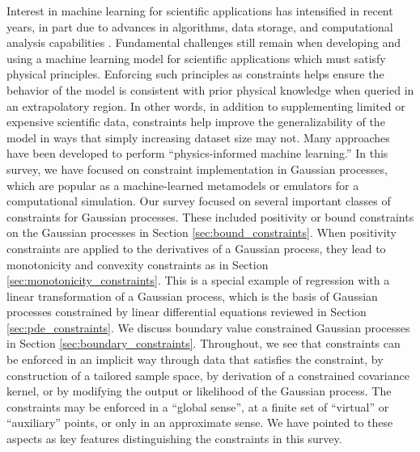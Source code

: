 \label{sec:conclusion}
Interest in machine learning for scientific applications has intensified in recent 
years, in part due to advances in algorithms, data storage, and computational 
analysis capabilities .  Fundamental challenges still remain when developing 
and using a machine learning model for scientific applications which must satisfy physical 
principles.  Enforcing such principles as constraints helps ensure the behavior of the 
model is consistent with prior physical knowledge when queried in an extrapolatory 
region. In other words, in addition to supplementing limited or expensive scientific data, 
constraints help improve the generalizability of the model in ways that simply increasing dataset size may not. 
Many approaches have been developed to perform ``physics-informed machine learning.'' 
In this survey, we have focused on constraint implementation in Gaussian processes, 
which are popular as a machine-learned metamodels or emulators for a computational simulation. 
Our survey focused on several important classes of constraints for Gaussian processes.
These included positivity or bound constraints on the Gaussian processes in Section \ref{sec:bound_constraints}.
When positivity constraints are applied to the derivatives of a Gaussian process, they lead to monotonicity and  convexity constraints as in Section \ref{sec:monotonicity_constraints}. This is a special example of regression with a linear transformation of a Gaussian process, which is the basis of Gaussian processes constrained by linear differential equations reviewed in Section \ref{sec:pde_constraints}. We discuss boundary value constrained Gaussian processes in Section \ref{sec:boundary_constraints}. 
Throughout, we see that constraints can be enforced in an implicit way through data that satisfies the constraint, by construction of a tailored sample space, by derivation of a constrained covariance kernel, or by modifying the output or likelihood of the Gaussian process. The constraints may be enforced in a ``global sense'', at a finite set of ``virtual'' or ``auxiliary'' points, or only in an approximate sense. We have pointed to these aspects as key features distinguishing the constraints in this survey. 
